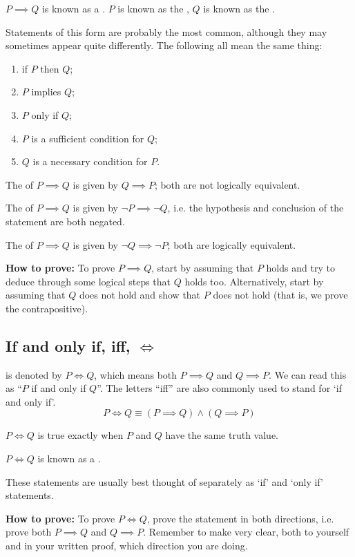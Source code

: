 $P \implies Q$ is known as a . $P$ is known as the , $Q$ is known as the .

Statements of this form are probably the most common, although they may sometimes appear quite differently. The following all mean the same thing:
\begin{enumerate}[label=(\roman*)]
\item if $P$ then $Q$;
\item $P$ implies $Q$;
\item $P$ only if $Q$;
\item $P$ is a sufficient condition for $Q$;
\item $Q$ is a necessary condition for $P$.
\end{enumerate}

The  of $P \implies Q$ is given by $Q \implies P$; both are not logically equivalent.

The  of $P \implies Q$ is given by $\lnot P \implies \lnot Q$, i.e. the hypothesis and conclusion of the statement are both negated.

The  of $P \implies Q$ is given by $\lnot Q \implies \lnot P$; both are logically equivalent.

\textbf{How to prove:} To prove $P \implies Q$, start by assuming that $P$ holds and try to deduce through some logical steps that $Q$ holds too. Alternatively, start by assuming that $Q$ does not hold and show that $P$ does not hold (that is, we prove the contrapositive).
\pagebreak

\subsection{If and only if, iff, $\iff$}
 is denoted by $P \iff Q$, which means both $P \implies Q$ and $Q \implies P$. We can read this as ``$P$ if and only if $Q$''. The letters ``iff'' are also commonly used to stand for ‘if and only if’.
\[ P \iff Q \equiv (P \implies Q) \land (Q \implies P) \]

$P \iff Q$ is true exactly when $P$ and $Q$ have the same truth value.

$P \iff Q$ is known as a .

These statements are usually best thought of separately as ‘if’ and ‘only if’ statements.

\textbf{How to prove:} To prove $P \iff Q$, prove the statement in both directions, i.e. prove both $P \implies Q$ and $Q \implies P$. Remember to make very clear, both to yourself and in your written proof, which direction you are doing.
\pagebreak

